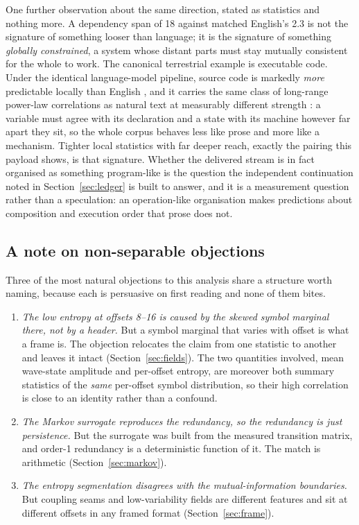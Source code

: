 \documentclass[11pt,a4paper]{article}
\begin{document}
One further observation about the same direction, stated as statistics and nothing
more. A dependency span of 18 against matched English's 2.3 is not the signature of
something looser than language; it is the signature of something \emph{globally
constrained}, a system whose distant parts must stay mutually consistent for the
whole to work. The canonical terrestrial example is executable code. Under the
identical language-model pipeline, source code is markedly \emph{more} predictable
locally than English \cite{hindle2012}, and it carries the same class of long-range
power-law correlations as natural text at measurably different strength
\cite{kokol1999}: a variable must agree with its declaration and a state with its
machine however far apart they sit, so the whole corpus behaves less like prose and
more like a mechanism. Tighter local statistics with far deeper reach, exactly the
pairing this payload shows, is that signature. Whether the delivered stream is in
fact organised as something program-like is the question the independent
continuation noted in Section~\ref{sec:ledger} is built to answer, and it is a
measurement question rather than a speculation: an operation-like organisation makes
predictions about composition and execution order that prose does not.

\subsection{A note on non-separable objections}

Three of the most natural objections to this analysis share a structure worth naming,
because each is persuasive on first reading and none of them bites.

\begin{enumerate}[leftmargin=1.6em,itemsep=3pt]
\item \emph{The low entropy at offsets 8--16 is caused by the skewed symbol marginal
there, not by a header.} But a symbol marginal that varies with offset is what a frame
is. The objection relocates the claim from one statistic to another and leaves it
intact (Section~\ref{sec:fields}). The two quantities involved, mean wave-state amplitude
and per-offset entropy, are moreover both summary statistics of the \emph{same}
per-offset symbol distribution, so their high correlation is close to an identity rather
than a confound.
\item \emph{The Markov surrogate reproduces the redundancy, so the redundancy is just
persistence.} But the surrogate was built from the measured transition matrix, and
order-1 redundancy is a deterministic function of it. The match is arithmetic
(Section~\ref{sec:markov}).
\item \emph{The entropy segmentation disagrees with the mutual-information boundaries.}
But coupling seams and low-variability fields are different features and sit at
different offsets in any framed format (Section~\ref{sec:frame}).
\end{enumerate}
\end{document}
